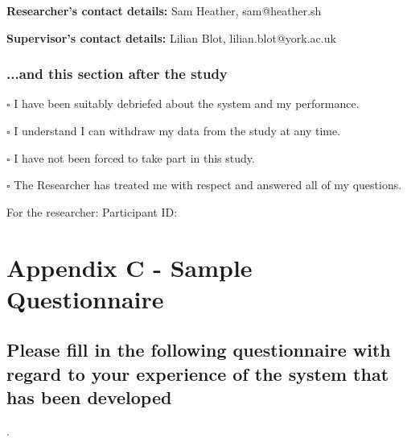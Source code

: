 \documentclass{article}
\begin{document}
{{\bf Researcher's contact details:} Sam Heather, sam@heather.sh

{\bf Supervisor's contact details:} Lilian Blot, lilian.blot@york.ac.uk

\pagebreak

\subsubsection*{...and this section after the study}
$\square$ I have been suitably debriefed about the system and my performance.

$\square$ I understand I can withdraw my data from the study at any time.

$\square$ I have not been forced to take part in this study.

$\square$ The Researcher has treated me with respect and answered all of my questions.

\vspace{10 mm}

For the researcher: Participant ID: \textunderscore\textunderscore\textunderscore\textunderscore\textunderscore

}

\newpage
\section*{Appendix C - Sample Questionnaire}
\label{sec:appendixQuestionnaire}
\newpage

\subsection*{Please fill in the following questionnaire with regard to your experience of the system that has been developed}.
\end{document}
